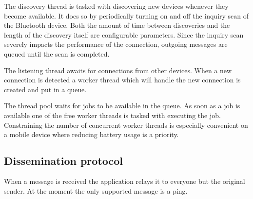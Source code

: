 The discovery thread is tasked with discovering new devices whenever they become available.
It does so by periodically turning on and off the inquiry scan of the Bluetooth device.
Both the amount of time between discoveries and the length of the discovery itself are configurable parameters.
Since the inquiry scan severely impacts the performance of the connection, outgoing messages are queued until the scan is completed.

The listening thread awaits for connections from other devices. When a new connection is detected a worker thread which will handle the new connection is created and put in a queue.

The thread pool waits for jobs to be available in the queue.
As soon as a job is available one of the free worker threads is tasked with executing the job.
Constraining the number of concurrent worker threads is especially convenient on a mobile device where reducing battery usage is a priority.

\subsection{Dissemination protocol}
When a message is received the application relays it to everyone but the original sender.
At the moment the only supported message is a ping.